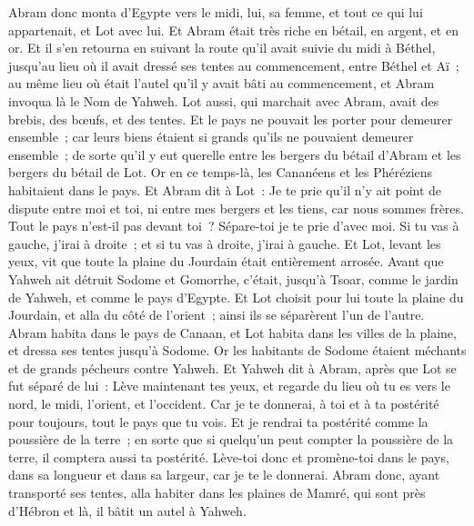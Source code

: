 \begin{multicols}{2}
\VerseOne{}Abram donc monta d'Egypte vers le midi, lui, sa femme, et tout ce qui lui appartenait, et Lot avec lui.
Et Abram était très riche en bétail, en argent, et en or.
Et il s'en retourna en suivant la route qu'il avait suivie du midi à Béthel, jusqu'au lieu où il avait dressé ses tentes au commencement, entre Béthel et Aï~;
au même lieu où était l'autel qu'il y avait bâti au commencement, et Abram invoqua là le Nom de Yahweh.
Lot aussi, qui marchait avec Abram, avait des brebis, des bœufs, et des tentes.
Et le pays ne pouvait les porter pour demeurer ensemble~; car leurs biens étaient si grands qu'ils ne pouvaient demeurer ensemble~;
de sorte qu'il y eut querelle entre les bergers du bétail d'Abram et les bergers du bétail de Lot. Or en ce temps-là, les Cananéens et les Phéréziens habitaient dans le pays.
Et Abram dit à Lot~: Je te prie qu'il n'y ait point de dispute entre moi et toi, ni entre mes bergers et les tiens, car nous sommes frères.
Tout le pays n'est-il pas devant toi~? Sépare-toi je te prie d'avec moi. Si tu vas à gauche, j'irai à droite~; et si tu vas à droite, j'irai à gauche.
Et Lot, levant les yeux, vit que toute la plaine du Jourdain était entièrement arrosée. Avant que Yahweh ait détruit Sodome et Gomorrhe, c'était, jusqu'à Tsoar, comme le jardin de Yahweh, et comme le pays d'Egypte.
Et Lot choisit pour lui toute la plaine du Jourdain, et alla du côté de l'orient~; ainsi ils se séparèrent l'un de l'autre.
Abram habita dans le pays de Canaan, et Lot habita dans les villes de la plaine, et dressa ses tentes jusqu'à Sodome.
Or les habitants de Sodome étaient méchants et de grands pécheurs contre Yahweh.
Et Yahweh dit à Abram, après que Lot se fut séparé de lui~: Lève maintenant tes yeux, et regarde du lieu où tu es vers le nord, le midi, l'orient, et l'occident.
Car je te donnerai, à toi et à ta postérité pour toujours, tout le pays que tu vois.
Et je rendrai ta postérité comme la poussière de la terre~; en sorte que si quelqu'un peut compter la poussière de la terre, il comptera aussi ta postérité.
Lève-toi donc et promène-toi dans le pays, dans sa longueur et dans sa largeur, car je te le donnerai.
Abram donc, ayant transporté ses tentes, alla habiter dans les plaines de Mamré, qui sont près d'Hébron et là, il bâtit un autel à Yahweh.

\end{multicols}
